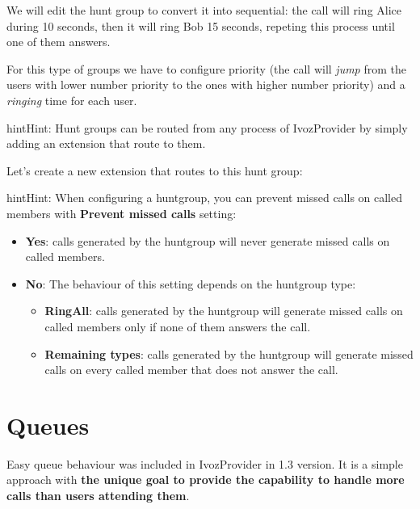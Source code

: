 \documentclass[letterpaper,10pt,english]{sphinxmanual}
\begin{document}
We will edit the hunt group to convert it into sequential: the call will ring
Alice during 10 seconds, then it will ring Bob 15 seconds, repeting this process
until one of them answers.

\noindent{}

For this type of groups we have to configure priority (the call will \emph{jump}
from the users with lower number priority to the ones with higher number
priority) and a \emph{ringing} time for each user.

\noindent{}

\begin{notice}{hint}{Hint:}
Hunt groups can be routed from any process of IvozProvider by simply
adding an extension that route to them.
\end{notice}

Let's create a new extension that routes to this hunt group:

\noindent{}

\begin{notice}{hint}{Hint:}
When configuring a huntgroup, you can prevent missed calls on called members with \textbf{Prevent missed calls} setting:
\begin{itemize}
\item {} 
\textbf{Yes}: calls generated by the huntgroup will never generate missed calls on called members.

\item {} 
\textbf{No}: The behaviour of this setting depends on the huntgroup type:
\begin{itemize}
\item {} 
\textbf{RingAll}: calls generated by the huntgroup will generate missed calls on called members only if none of them answers the call.

\item {} 
\textbf{Remaining types}: calls generated by the huntgroup will generate missed calls on every called member that does not answer the call.

\end{itemize}

\end{itemize}
\end{notice}


\section{Queues}
\label{pbx_features/queues:queues}\label{pbx_features/queues::doc}
Easy queue behaviour was included in IvozProvider in 1.3 version. It is a simple
approach with \textbf{the unique goal to provide the capability to handle more calls
than users attending them}.
\end{document}
